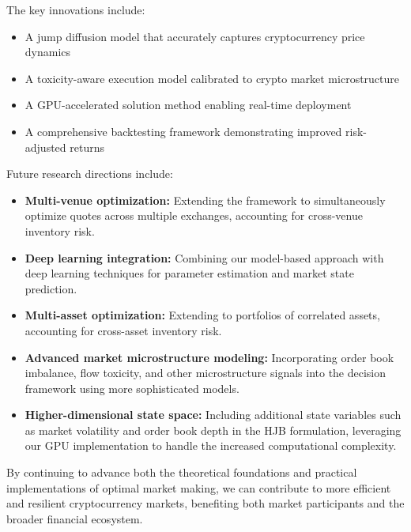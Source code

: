 \documentclass[twocolumn,ieee]{arithmaxresearch}
\begin{document}
\begin{onecolumn}
\begin{twocolumn}
The key innovations include:
\begin{itemize}
    \item A jump diffusion model that accurately captures cryptocurrency price dynamics
    \item A toxicity-aware execution model calibrated to crypto market microstructure
    \item A GPU-accelerated solution method enabling real-time deployment
    \item A comprehensive backtesting framework demonstrating improved risk-adjusted returns
\end{itemize}

Future research directions include:

\begin{itemize}
    \item \textbf{Multi-venue optimization:} Extending the framework to simultaneously optimize quotes across multiple exchanges, accounting for cross-venue inventory risk.
    
    \item \textbf{Deep learning integration:} Combining our model-based approach with deep learning techniques for parameter estimation and market state prediction.
    
    \item \textbf{Multi-asset optimization:} Extending to portfolios of correlated assets, accounting for cross-asset inventory risk.
    
    \item \textbf{Advanced market microstructure modeling:} Incorporating order book imbalance, flow toxicity, and other microstructure signals into the decision framework using more sophisticated models.
    
    \item \textbf{Higher-dimensional state space:} Including additional state variables such as market volatility and order book depth in the HJB formulation, leveraging our GPU implementation to handle the increased computational complexity.
\end{itemize}

By continuing to advance both the theoretical foundations and practical implementations of optimal market making, we can contribute to more efficient and resilient cryptocurrency markets, benefiting both market participants and the broader financial ecosystem.

\begin{thebibliography}{99}


\end{thebibliography}
\end{twocolumn}
\end{onecolumn}
\end{document}
